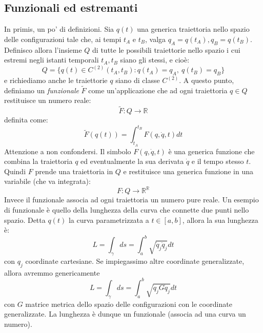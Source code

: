 \documentclass[a4paper,openany]{article}
\begin{document}
	\subsection{Funzionali ed estremanti}
	In primis, un po' di definizioni. Sia $q(t)$ una generica traiettoria nello spazio delle configurazioni tale che, ai tempi $t_A \mbox{ e } t_B$, valga $q_A = q(t_A), q_B = q(t_B)$. Definisco allora l'insieme $Q$ di tutte le possibili traiettorie nello spazio i cui estremi negli istanti temporali $t_A, t_B$ siano gli stessi, e cioè:
	\begin{equation}
		Q = \{q(t)\in C^{(2)}(t_A,t_B): q(t_A) = q_A, \> q(t_B) = q_B\}
	\end{equation}
	e richiediamo anche le traiettorie $q$ siano di classe $C^{(2)}$. A questo punto, definiamo un \textit{funzionale} $\tilde{F}$ come un'applicazione che ad ogni traiettoria $q \in Q$ restituisce un numero reale:
	$$
	\tilde{F} : Q \rightarrow \mathbb{R}
	$$
	definita come:
	$$
	\tilde{F}(q(t)) = \int_{t_A}^{t_B}F(q,\dot{q},t) dt
	$$
	Attenzione a non confondersi. Il simbolo $F(q,\dot{q},t)$ è una generica funzione che combina la traiettoria $q$ ed eventualmente la sua derivata $\dot{q}$ e il tempo stesso $t$. Quindi $F$ prende una traiettoria in $Q$ e restituisce una generica funzione in una variabile (che va integrata):
	$$
	F : Q \rightarrow \mathbb{R}^{\mathbb{R}}
	$$
	Invece il funzionale associa ad ogni traiettoria un numero pure reale. Un esempio di funzionale è quello della lunghezza della curva che connette due punti nello spazio. Detta $q(t)$ la curva parametrizzata a $t\in[a,b]$, allora la sua lunghezza è:
	$$
	L = \int_{\gamma}ds = \int_{a}^{b}\sqrt{\dot{q}_j \dot{q}_j}dt
	$$
	con $q_j$ coordinate cartesiane. Se impiegassimo altre coordinate generalizzate, allora avremmo genericamente
	$$
	L = \int_{\gamma}ds = \int_{a}^{b}\sqrt{\dot{q}_j G\dot{q}_j}dt
	$$
	con $G$ matrice metrica dello spazio delle configurazioni con le coordinate generalizzate. La lunghezza è dunque un funzionale (associa ad una curva un numero). 
	
\end{document}
